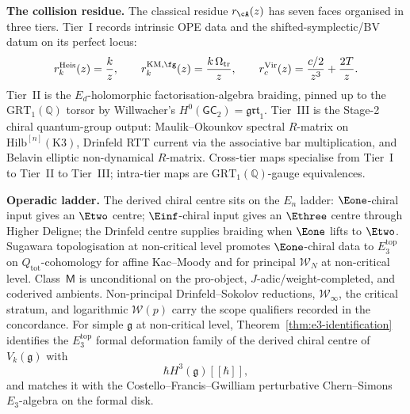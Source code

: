\medskip
\noindent\textbf{The collision residue.}\enspace
The classical residue $r_\cA(z)$ has seven faces organised in three
tiers. Tier~I records intrinsic OPE data and the
shifted-symplectic/BV datum on its perfect locus:
\[
 r^{\mathrm{Heis}}_k(z)=\frac{k}{z},
 \qquad
 r^{\mathrm{KM},\fg}_k(z)=\frac{k\,\Omega_{\mathrm{tr}}}{z},
 \qquad
 r^{\mathrm{Vir}}_c(z)=\frac{c/2}{z^3}+\frac{2T}{z}.
\]
Tier~II is the $E_d$-holomorphic factorisation-algebra braiding,
pinned up to the $\mathrm{GRT}_1(\mathbb Q)$ torsor by
Willwacher's $H^0(\mathsf{GC}_2)=\mathfrak{grt}_1$. Tier~III is the
Stage-2 chiral quantum-group output: Maulik--Okounkov spectral
$R$-matrix on $\mathrm{Hilb}^{[n]}(\mathrm{K3})$, Drinfeld RTT
current via the associative bar multiplication, and Belavin elliptic
non-dynamical $R$-matrix. Cross-tier maps specialise from Tier~I to
Tier~II to Tier~III; intra-tier maps are
$\mathrm{GRT}_1(\mathbb Q)$-gauge equivalences.

\medskip
\noindent\textbf{Operadic ladder.}\enspace
The derived chiral centre sits on the $E_n$ ladder: $\Eone$-chiral
input gives an $\Etwo$ centre; $\Einf$-chiral input gives an
$\Ethree$ centre through Higher Deligne; the Drinfeld centre supplies
braiding when $\Eone$ lifts to $\Etwo$. Sugawara topologisation at
non-critical level promotes $\Eone$-chiral data to
$E_3^{\mathrm{top}}$ on $Q_{\mathrm{tot}}$-cohomology for affine
Kac--Moody and for principal $\mathcal W_N$ at non-critical level.
Class~$\mathsf M$ is unconditional on the pro-object,
$J$-adic/weight-completed, and coderived ambients. Non-principal
Drinfeld--Sokolov reductions, $\mathcal W_\infty$, the critical
stratum, and logarithmic $\mathcal W(p)$ carry the scope qualifiers
recorded in the concordance. For simple $\mathfrak g$ at non-critical
level, Theorem~\ref{thm:e3-identification} identifies the
$E_3^{\mathrm{top}}$ formal deformation family of the derived chiral
centre of $V_k(\mathfrak g)$ with
\[
 \hbar H^3(\mathfrak g)[[\hbar]],
\]
and matches it with the Costello--Francis--Gwilliam perturbative
Chern--Simons $E_3$-algebra on the formal disk.

